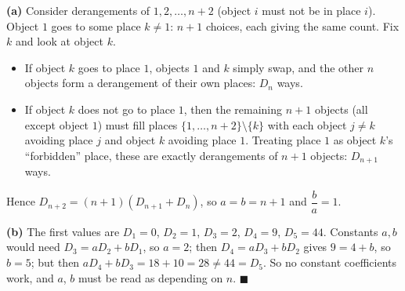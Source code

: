 \textbf{(a)} Consider derangements of $1,2,\dots,n+2$ (object $i$ must not be in place $i$). Object $1$ goes to some place $k\ne1$: $n+1$ choices, each giving the same count. Fix $k$ and look at object $k$.
\begin{itemize}
\item If object $k$ goes to place $1$, objects $1$ and $k$ simply swap, and the other $n$ objects form a derangement of their own places: $D_n$ ways.
\item If object $k$ does not go to place $1$, then the remaining $n+1$ objects (all except object $1$) must fill places $\{1,\dots,n+2\}\setminus\{k\}$ with each object $j\ne k$ avoiding place $j$ and object $k$ avoiding place $1$. Treating place $1$ as object $k$'s ``forbidden'' place, these are exactly derangements of $n+1$ objects: $D_{n+1}$ ways.
\end{itemize}
Hence $D_{n+2}=(n+1)\left(D_{n+1}+D_n\right)$, so $a=b=n+1$ and $\dfrac {b}{a}=\boxed{1}$.

\textbf{(b)} The first values are $D_1=0$, $D_2=1$, $D_3=2$, $D_4=9$, $D_5=44$. Constants $a,b$ would need $D_3=aD_2+bD_1$, so $a=2$; then $D_4=aD_3+bD_2$ gives $9=4+b$, so $b=5$; but then $aD_4+bD_3=18+10=28\ne44=D_5$. So no constant coefficients work, and $a$, $b$ must be read as depending on $n$. $\blacksquare$
